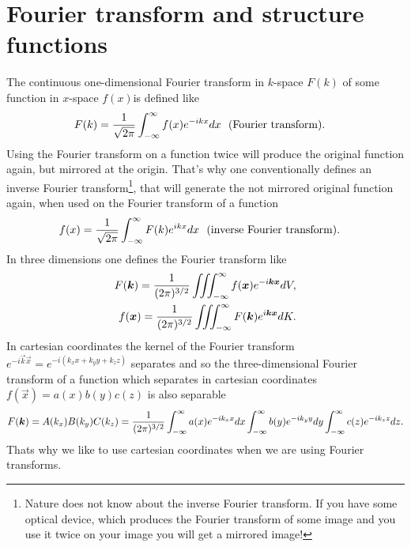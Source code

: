\chapter{Fourier transform and structure functions}
The continuous one-dimensional Fourier transform in $k$-space $F(k)$ of some
function in
$x$-space $f(x)$is defined like
\begin{align}
F(k)&=\frac{1}{\sqrt{2\pi}}\int_{-\infty}^{\infty} f(x) e^{-ikx} dx\ \ \text{(Fourier transform)}.
\end{align}
Using the Fourier transform on a function twice will produce
the original function again, but mirrored at the origin.
That's why one conventionally defines an inverse Fourier
transform\footnote{Nature does not know about the inverse Fourier transform.
If you have some optical device, which produces the Fourier transform
of some image and you use it twice on your image you will get a mirrored
image!},
that will generate the not mirrored original function again, when used on the
Fourier transform of a function
\begin{align}
f(x)&=\frac{1}{\sqrt{2\pi}}\int_{-\infty}^{\infty} F(k) e^{ikx} dx\ \ \text{(inverse Fourier transform)}.
\end{align}
In three dimensions one defines the Fourier transform like
\begin{align}
F(\boldsymbol{k})=\frac{1}{(2\pi)^{3/2}}\iiint^{\infty}_{-\infty} f(\boldsymbol{x}) e^{-i\boldsymbol{k}\boldsymbol{x}} dV, \\
f(\boldsymbol{x})=\frac{1}{(2\pi)^{3/2}}\iiint^{\infty}_{-\infty} F(\boldsymbol{k}) e^{i\boldsymbol{k}\boldsymbol{x}} dK.
\end{align}
In cartesian coordinates the kernel of the Fourier transform 
$e^{-i\vec{k}\vec{x}}=e^{-i(k_xx+k_yy+k_zz)}$
separates and so the three-dimensional Fourier transform of a function
which separates in cartesian coordinates $f(\vec{x})=a(x)b(y)c(z)$ is 
also separable
\begin{align*}
F(\boldsymbol{k})=A(k_x)B(k_y)C(k_z)=
\frac{1}{(2\pi)^{3/2}}\int_{-\infty}^{\infty} a(x) e^{-ik_xx} dx 
\int_{-\infty}^{\infty} b(y) e^{-ik_yy} dy
\int_{-\infty}^{\infty} c(z) e^{-ik_zz} dz.
\end{align*}
Thats why we like to use cartesian coordinates when we are using Fourier
transforms.
